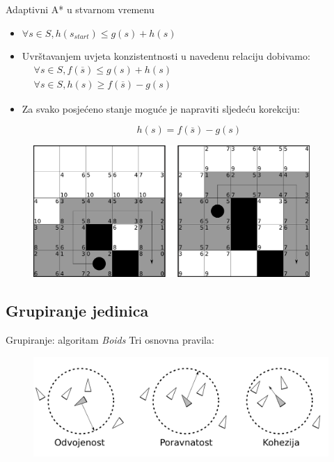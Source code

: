 \documentclass[utf8]{beamer}
\begin{document}
\begin{frame}{Adaptivni A* u stvarnom vremenu}
     {
        \begin{itemize}
            \item \(\forall s \in S, h(s_{start}) \leq g(s) + h(s)\)

            \item {
                Uvrštavanjem uvjeta konzistentnosti u navedenu relaciju dobivamo:
                \(
                \begin{aligned}
                & \forall s \in S, f(\overline{s}) \leq g(s) + h(s)\\
                & \forall s \in S, h(s) \geq f(\overline{s}) - g(s)
                \end{aligned}
                \)
            }

            \item { 
                Za svako posjećeno stanje moguće je napraviti sljedeću korekciju:
                
                \[h(s) = f(\overline{s}) - g(s)\]
            }
        \end{itemize}
    }

     {
        \begin{figure}[h]
            \centering
            \includegraphics[height=5cm]{images/rtaastar.pdf}
        \end{figure}
    }
\end{frame}

\subsection{Grupiranje jedinica}

\begin{frame}{Grupiranje: algoritam \textit{Boids}}
    Tri osnovna pravila:
    \begin{figure}[h]
        \centering
        \includegraphics[width=1.0\linewidth]{images/boids.pdf}
    \end{figure}
\end{frame}
\end{document}
